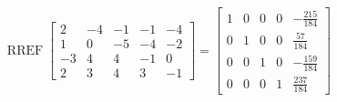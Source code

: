 \begin{exerciseAnswer} 


\[\operatorname{RREF} \left[\begin{array}{ccccc}
2 & -4 & -1 & -1 & -4 \\
1 & 0 & -5 & -4 & -2 \\
-3 & 4 & 4 & -1 & 0 \\
2 & 3 & 4 & 3 & -1
\end{array}\right] = \left[\begin{array}{ccccc}
1 & 0 & 0 & 0 & -\frac{215}{184} \\
0 & 1 & 0 & 0 & \frac{57}{184} \\
0 & 0 & 1 & 0 & -\frac{159}{184} \\
0 & 0 & 0 & 1 & \frac{237}{184}
\end{array}\right] \]



\end{exerciseAnswer}
